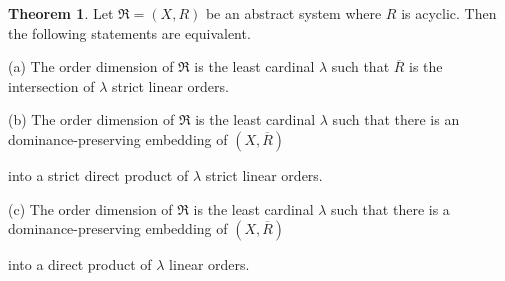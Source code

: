 \documentclass{article}
\theoremstyle{definition}
\newtheorem{theorem}{Theorem}[section]
\begin{document}
\begin{theorem}\label{a126}Let $\mathfrak{R}=(X,R)$ be an abstract system where $R$ is acyclic. Then the following statements are equivalent.
\par\noindent
(a) The order dimension of $\mathfrak{R}$ is the least cardinal $\lambda$ such that $\overline{R}$ is the intersection of $\lambda$ strict linear orders.
\par\noindent
(b) The order dimension of $\mathfrak{R}$
is the least cardinal $\lambda$ such that there is an dominance-preserving embedding of $(X,\overline{R})$ 

\! \!\!
into a strict direct product 
of $\lambda$ strict linear orders.
\par\noindent
(c) The order dimension of $\mathfrak{R}$
is the least cardinal $\lambda$ such that there is a dominance-preserving embedding of $(X,\overline{R})$ 

\! \!\!
into a 
direct product 
of $\lambda$ linear orders.
\end{theorem}
\end{document}
